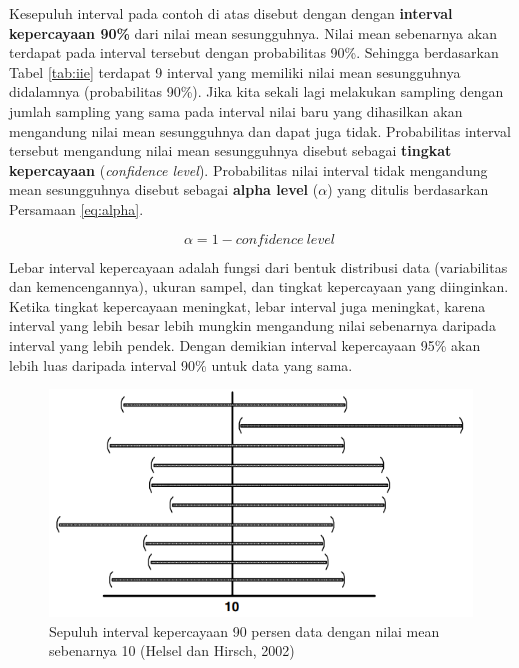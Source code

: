 \documentclass[]{book}
\begin{document}
Kesepuluh interval pada contoh di atas disebut dengan dengan
\textbf{interval kepercayaan 90\%} dari nilai mean sesungguhnya. Nilai
mean sebenarnya akan terdapat pada interval tersebut dengan probabilitas
90\%. Sehingga berdasarkan Tabel \ref{tab:iie} terdapat 9 interval yang
memiliki nilai mean sesungguhnya didalamnya (probabilitas 90\%). Jika
kita sekali lagi melakukan sampling dengan jumlah sampling yang sama
pada interval nilai baru yang dihasilkan akan mengandung nilai mean
sesungguhnya dan dapat juga tidak. Probabilitas interval tersebut
mengandung nilai mean sesungguhnya disebut sebagai \textbf{tingkat
kepercayaan} (\emph{confidence level}). Probabilitas nilai interval
tidak mengandung mean sesungguhnya disebut sebagai \textbf{alpha level}
(\(\alpha\)) yang ditulis berdasarkan Persamaan \eqref{eq:alpha}.

\begin{equation}
  \alpha=1-confidence\ level\ 
  \label{eq:alpha}
\end{equation}

Lebar interval kepercayaan adalah fungsi dari bentuk distribusi data
(variabilitas dan kemencengannya), ukuran sampel, dan tingkat
kepercayaan yang diinginkan. Ketika tingkat kepercayaan meningkat, lebar
interval juga meningkat, karena interval yang lebih besar lebih mungkin
mengandung nilai sebenarnya daripada interval yang lebih pendek. Dengan
demikian interval kepercayaan 95\% akan lebih luas daripada interval
90\% untuk data yang sama.

\begin{figure}

{\centering \includegraphics[width=0.65\linewidth]{iievis} 

}

\caption{Sepuluh interval kepercayaan 90 persen data dengan nilai mean sebenarnya 10 (Helsel dan Hirsch, 2002)}\label{fig:iievis}
\end{figure}
\end{document}
